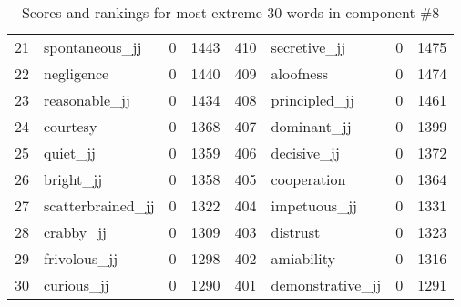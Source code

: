 \begin{table}[tbp]
\begin{tabular}{| rlr@{.}l | rlr@{.}l |}
    21 & spontaneous\_jj & 0 & 1443    &    410 & secretive\_jj & 0 & 1475 \\
    22 & negligence & 0 & 1440    &    409 & aloofness & 0 & 1474 \\
    23 & reasonable\_jj & 0 & 1434    &    408 & principled\_jj & 0 & 1461 \\
    24 & courtesy & 0 & 1368    &    407 & dominant\_jj & 0 & 1399 \\
    25 & quiet\_jj & 0 & 1359    &    406 & decisive\_jj & 0 & 1372 \\
    26 & bright\_jj & 0 & 1358    &    405 & cooperation & 0 & 1364 \\
    27 & scatterbrained\_jj & 0 & 1322    &    404 & impetuous\_jj & 0 & 1331 \\
    28 & crabby\_jj & 0 & 1309    &    403 & distrust & 0 & 1323 \\
    29 & frivolous\_jj & 0 & 1298    &    402 & amiability & 0 & 1316 \\
    30 & curious\_jj & 0 & 1290    &    401 & demonstrative\_jj & 0 & 1291 \\
    \hline
    \end{tabular}
    \caption{Scores and rankings for most extreme 30 words in component \#8} 
\end{table}
\clearpage

